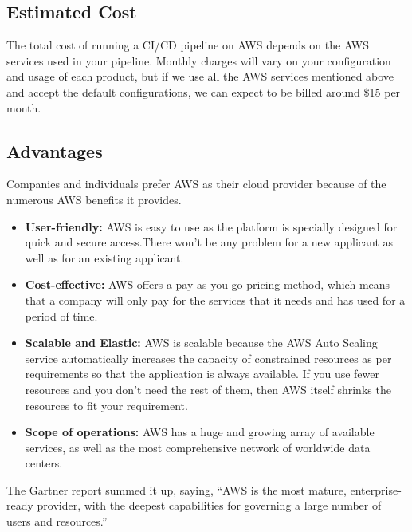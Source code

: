 %

\subsection{Estimated Cost}
%
The total cost of running a CI/CD pipeline on AWS depends on the AWS services used in your pipeline. Monthly charges will vary on your configuration and usage of each product, but if we use all the AWS services mentioned above and accept the default configurations, we can expect to be billed around \$15 per month.
%

\subsection{Advantages}
%
Companies and individuals prefer AWS as their cloud provider because of the numerous AWS benefits it provides.

\begin{itemize}
    \item \textbf{User-friendly:} AWS is easy to use as the platform is specially designed for quick and secure access.There won’t be any problem for a new applicant as well as for an existing applicant.
    \item \textbf{Cost-effective:} AWS offers a pay-as-you-go pricing method, which means that a company will only pay for the services that it needs and has used for a period of time.
    \item \textbf{Scalable and Elastic:} AWS is scalable because the AWS Auto Scaling service automatically increases the capacity of constrained resources as per requirements so that the application is always available. If you use fewer resources and you don’t need the rest of them, then AWS itself shrinks the resources to fit your requirement.
    \item \textbf{Scope of operations: } AWS has a huge and growing array of available services, as well as the most comprehensive network of worldwide data centers.
    
\end{itemize}
The Gartner report summed it up, saying, “AWS is the most mature, enterprise-ready provider, with the deepest capabilities for governing a large number of users and resources.”


%


